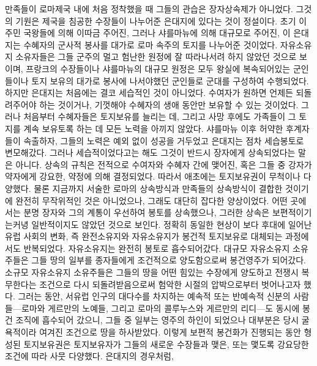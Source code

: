 만족들이 로마제국 내에 처음 정착했을 때
그들의 관습은 장자상속제가 아니었다.
그것의 기원은 제국을 침공한 수장들이 나누어준
은대지에 있다는 것이 정설이다.
초기 이주민 국왕들에 의해 이따금 주어진,
그러나 샤를마뉴에 의해 대규모로 주어진,
이 은대지는 수혜자의 군사적 봉사를 대가로
로마 속주의 토지를 나누어준 것이었다.
자유소유지 소유자들은 그들 군주의 멀고 험난한 원정에
잘 따라나서려 하지 않았던 것으로 보이며,
프랑크의 수장들이나 샤를마뉴의 대규모 원정은
모두
왕실에 복속되어있는 군인들이나
토지 보유의 대가로 봉사에 나서야했던 군인들로
군대를 구성하여 수행되었다.
하지만 은대지는 처음에는 결코 세습적인 것이 아니었다.
수여자가 원하면 언제든 되돌려주어야 하는 것이거나,
기껏해야 수혜자의 생애 동안만 보유할 수 있는 것이었다.
그러나 처음부터 수혜자들은 토지보유를 늘리는 데, 그리고
사망 후에도 가족들이 그 토지를 계속 보유토록 하는 데
모든 노력을 아끼지 않았다.
샤를마뉴 이후 허약한 후계자들이 속출하자,
그들의 노력은 예외 없이 성공을 거두었고
은대지는 점차 세습봉토로 변모해갔다.
그러나 세습적이었다고는 해도 그것이 반드시
장자에게 상속되었다는 말은 아니다.
상속의 규칙은 전적으로 수여자와 수혜자 간에 맺어진,
혹은 그들 중 강자가 약자에게 강요한,
약정에 의해 결정되었다.
따라서 애초에는 토지보유권이 무척이나 다양했다.
물론 지금까지 서술한 로마의 상속방식과 만족들의 상속방식이
결합한 것이기에 완전히 무작위적인 것은 아니었으나,
그래도 대단히 잡다한 양상이었다.
어떤 곳에서는 분명 장자와 그의 계통이 우선하여 봉토를 상속했으나,
그러한 상속은 보편적이기는커녕 일반적이지도 않았던 것으로 보인다.
정확히 동일한 현상이
보다 후대에 일어난 유럽 사회의 변화,
즉  완전소유지와
 자유소유지가
봉건적 토지보유로 대체되는 과정에서도
반복되었다.
자유소유지는 완전히 봉토로 흡수되어갔다.
대규모 자유소유지 소유주들은
그들 땅의 일부를 종자들에게 조건적으로 양도함으로써
봉건영주가 되어갔다.
소규모 자유소유지 소유주들은
그들의 땅을 어떤 힘있는 수장에게 양도하고
전쟁시 복무한다는 조건으로 다시 되돌려받음으로써
험악한 시절의 압박으로부터 벗어나고자 했다.
그러는 동안,
서유럽 인구의 대다수를 차지하는
예속적 또는 반예속적 신분의 사람들---로마와 게르만의 노예들,
그리고 로마의 콜루누스와 게르만의 리디---도
동시에
봉건 조직에 흡수되어 갔으니,
그들 중 일부는 영주의 하인이 되었으나
대부분은 당시 굴욕적이라 여겨진 조건으로 땅을 하사받았다.
이렇게 보편적 봉건화가 진행되는 동안 형성된 토지보유권은
토지보유자가 그들의 새로운 수장들과 맺은, 또는
맻도록 강요당한 조건에 따라 사뭇 다양했다.
은대지의 경우처럼,
